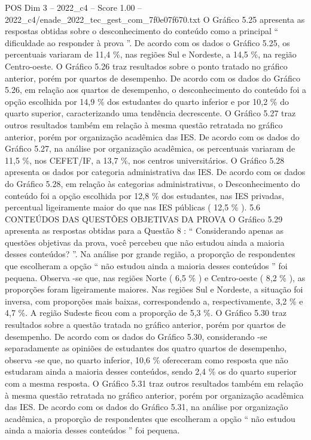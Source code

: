 \begin{textsample}{POS Dim 3 – 2022\_c4 – Score 1.00 – 2022\_c4/enade\_2022\_tec\_gest\_com\_7f0e07f670.txt}
O Gráfico 5.25 apresenta as respostas obtidas sobre o desconhecimento do conteúdo como a principal “ dificuldade ao responder à prova ”.
De acordo com os dados o Gráfico 5.25, os percentuais variaram de 11,4 \%, nas regiões Sul e Nordeste, a 14,5 \%, na região Centro-oeste.
O Gráfico 5.26 traz resultados sobre o ponto tratado no gráfico anterior, porém por quartos de desempenho.
De acordo com os dados do Gráfico 5.26, em relação aos quartos de desempenho, o desconhecimento do conteúdo foi a opção escolhida por 14,9 \% dos estudantes do quarto inferior e por 10,2 \% do quarto superior, caracterizando uma tendência decrescente.
O Gráfico 5.27 traz outros resultados também em relação à mesma questão retratada no gráfico anterior, porém por organização acadêmica das IES.
De acordo com os dados do Gráfico 5.27, na análise por organização acadêmica, os percentuais variaram de 11,5 \%, nos CEFET/IF, a 13,7 \%, nos centros universitários.
O Gráfico 5.28 apresenta os dados por categoria administrativa das IES.
De acordo com os dados do Gráfico 5.28, em relação às categorias administrativas, o Desconhecimento do conteúdo foi a opção escolhida por 12,8 \% dos estudantes, nas IES privadas, percentual ligeiramente maior do que nas IES públicas ( 12,5 \% ). 5.6 CONTEÚDOS DAS QUESTÕES OBJETIVAS DA PROVA O Gráfico 5.29 apresenta as respostas obtidas para a Questão 8 : “ Considerando apenas as questões objetivas da prova, você percebeu que não estudou ainda a maioria desses conteúdos? ”.
Na análise por grande região, a proporção de respondentes que escolheram a opção “ não estudou ainda a maioria desses conteúdos ” foi pequena.
Observa -se que, nas regiões Norte ( 6,5 \% ) e Centro-oeste ( 8,2 \% ), as proporções foram ligeiramente maiores.
Nas regiões Sul e Nordeste, a situação foi inversa, com proporções mais baixas, correspondendo a, respectivamente, 3,2 \% e 4,7 \%.
A região Sudeste ficou com a proporção de 5,3 \%.
O Gráfico 5.30 traz resultados sobre a questão tratada no gráfico anterior, porém por quartos de desempenho.
De acordo com os dados do Gráfico 5.30, considerando -se separadamente as opiniões de estudantes dos quatro quartos de desempenho, observa -se que, no quarto inferior, 10,6 \% ofereceram como resposta que não estudaram ainda a maioria desses conteúdos, sendo 2,4 \% os do quarto superior com a mesma resposta.
O Gráfico 5.31 traz outros resultados também em relação à mesma questão retratada no gráfico anterior, porém por organização acadêmica das IES.
De acordo com os dados do Gráfico 5.31, na análise por organização acadêmica, a proporção de respondentes que escolheram a opção “ não estudou ainda a maioria desses conteúdos ” foi pequena.

\end{textsample}
